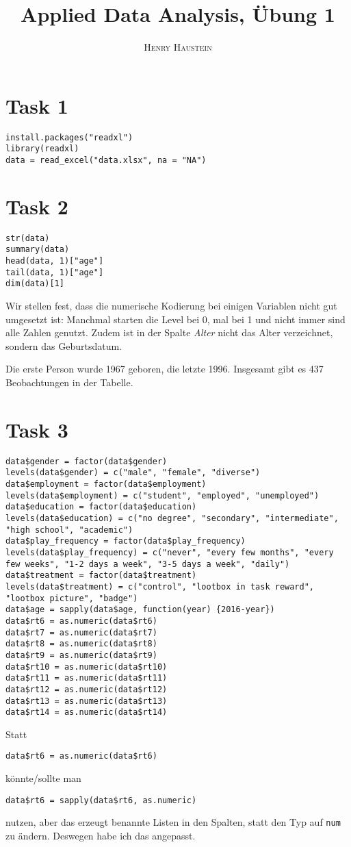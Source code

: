 \documentclass{article}
\title{\textbf{Applied Data Analysis, Übung 1}}
\author{\textsc{Henry Haustein}}
\date{}
\begin{document}
	\maketitle
	
	\section*{Task 1}
	\begin{lstlisting}
install.packages("readxl")
library(readxl)
data = read_excel("data.xlsx", na = "NA")
	\end{lstlisting}

	\section*{Task 2}
	\begin{lstlisting}
str(data)
summary(data)
head(data, 1)["age"]
tail(data, 1)["age"]
dim(data)[1]
	\end{lstlisting}
	Wir stellen fest, dass die numerische Kodierung bei einigen Variablen nicht gut umgesetzt ist: Manchmal starten die Level bei 0, mal bei 1 und nicht immer sind alle Zahlen genutzt. Zudem ist in der Spalte \textit{Alter} nicht das Alter verzeichnet, sondern das Geburtsdatum.
	
	Die erste Person wurde 1967 geboren, die letzte 1996. Insgesamt gibt es 437 Beobachtungen in der Tabelle.
	
	\section*{Task 3}
	\begin{lstlisting}
data$gender = factor(data$gender)
levels(data$gender) = c("male", "female", "diverse")
data$employment = factor(data$employment)
levels(data$employment) = c("student", "employed", "unemployed")
data$education = factor(data$education)
levels(data$education) = c("no degree", "secondary", "intermediate", "high school", "academic")
data$play_frequency = factor(data$play_frequency)
levels(data$play_frequency) = c("never", "every few months", "every few weeks", "1-2 days a week", "3-5 days a week", "daily")
data$treatment = factor(data$treatment)
levels(data$treatment) = c("control", "lootbox in task reward", "lootbox picture", "badge")
data$age = sapply(data$age, function(year) {2016-year})
data$rt6 = as.numeric(data$rt6)
data$rt7 = as.numeric(data$rt7)
data$rt8 = as.numeric(data$rt8)
data$rt9 = as.numeric(data$rt9)
data$rt10 = as.numeric(data$rt10)
data$rt11 = as.numeric(data$rt11)
data$rt12 = as.numeric(data$rt12)
data$rt13 = as.numeric(data$rt13)
data$rt14 = as.numeric(data$rt14)
	\end{lstlisting}
	Statt
	\begin{lstlisting}
data$rt6 = as.numeric(data$rt6)
	\end{lstlisting}
	könnte/sollte man
	\begin{lstlisting}
data$rt6 = sapply(data$rt6, as.numeric)
	\end{lstlisting}
	nutzen, aber das erzeugt benannte Listen in den Spalten, statt den Typ auf \texttt{num} zu ändern. Deswegen habe ich das angepasst.
	
\end{document}

